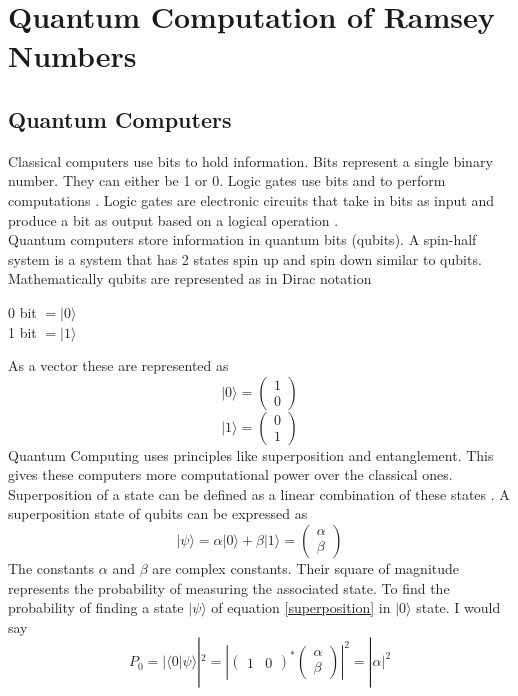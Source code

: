 \documentclass{Assignment}
\begin{document}
\section{Quantum Computation of Ramsey Numbers}
\subsection{Quantum Computers}
Classical computers use bits to hold information.
Bits represent a single binary number.
They can either be 1 or 0.
Logic gates use bits and to perform computations \cite{deutsch1985quantum}.
Logic gates are electronic circuits that take in bits as input and produce a bit as output based on a logical operation \cite{Jaeger1997}.\\
Quantum computers store information in quantum bits (qubits).
A spin-half system is a system that has 2 states spin up and spin down similar to qubits.
Mathematically qubits are represented  as in Dirac notation \begin{center}
	0 bit $=|0\rangle $ \\1 bit $=  |1\rangle$
\end{center}
As a vector these are represented as 
$$|0\rangle = \begin{pmatrix}
	1\\0
\end{pmatrix}$$
$$|1\rangle = \begin{pmatrix}
	0\\1
\end{pmatrix}$$
Quantum Computing uses principles like superposition and entanglement.
This gives these computers more computational power over the classical ones.
Superposition of a state can be defined as a linear combination of these states \cite{mcintyre_quantum_2012}.
A superposition state of qubits can be expressed as \begin{equation}
|\psi\rangle = \alpha|0\rangle + \beta|1\rangle = \begin{pmatrix}
	\alpha\\\beta
\label{superposition}
\end{pmatrix} \end{equation}
The constants $\alpha $ and $ \beta$ are complex constants.
Their square of magnitude represents the probability of measuring the associated state.
To find the probability of finding a state $|\psi\rangle$ of equation \eqref{superposition} in $|0\rangle$ state.
I would say
 $$P_0=|\langle0|\psi\rangle|^2 = \left| \begin{pmatrix}
 	1&0
 \end{pmatrix}^*\begin{pmatrix}
 	\alpha\\\beta
 \end{pmatrix} \right|^2 = |\alpha|^2$$
\end{document}
